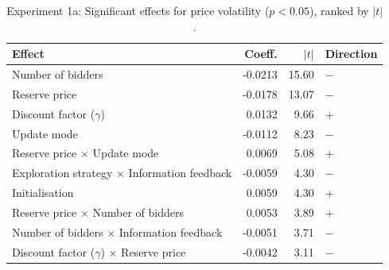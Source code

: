 \begin{table}[H]
\centering
\caption{Experiment 1a: Significant effects for price volatility ($p < 0.05$), ranked by $|t|$.}
\label{tab:exp1a_ranked_vol}
\begin{tabular}{lrrl}
\toprule
\textbf{Effect} & \textbf{Coeff.} & \textbf{$|t|$} & \textbf{Direction} \\
\midrule
Number of bidders & -0.0213 & 15.60 & $-$ \\
Reserve price & -0.0178 & 13.07 & $-$ \\
Discount factor ($\gamma$) & 0.0132 & 9.66 & + \\
Update mode & -0.0112 & 8.23 & $-$ \\
Reserve price $\times$ Update mode & 0.0069 & 5.08 & + \\
Exploration strategy $\times$ Information feedback & -0.0059 & 4.30 & $-$ \\
Initialisation & 0.0059 & 4.30 & + \\
Reserve price $\times$ Number of bidders & 0.0053 & 3.89 & + \\
Number of bidders $\times$ Information feedback & -0.0051 & 3.71 & $-$ \\
Discount factor ($\gamma$) $\times$ Reserve price & -0.0042 & 3.11 & $-$ \\
\bottomrule
\end{tabular}
\end{table}
